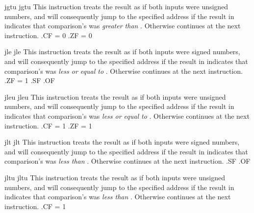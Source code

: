 \begin{instruction}{jgtu}
  \jumptype
     {jgtu}
     {\jjgtuopc}
     {This instruction treats the  result as if both
       inputs were unsigned numbers, and will consequently jump to the
       specified address if the result in  indicates that
       comparison's  was \emph{greater than} .
       Otherwise continues at the next instruction.}
     {.CF = 0 \wedge {}.ZF = 0}
\end{instruction}

\begin{instruction}{jle}
  \jumptype
     {jle}
     {\jjleopc}
     {This instruction treats the  result as if both
       inputs were signed numbers, and will consequently jump to the
       specified address if the result in  indicates that
       comparison's  was \emph{less or equal to} .
       Otherwise continues at the next instruction.}
     {.ZF = 1 \vee {}.SF \neq {}.OF}
\end{instruction}

\begin{instruction}{jleu}
  \jumptype
     {jleu}
     {\jjleuopc}
     {This instruction treats the  result as if both
       inputs were unsigned numbers, and will consequently jump to the
       specified address if the result in  indicates that
       comparison's  was \emph{less or equal to} .
       Otherwise continues at the next instruction.}
     {.CF = 1 \vee {}.ZF = 1}
\end{instruction}

\begin{instruction}{jlt}
  \jumptype
     {jlt}
     {\jjltopc}
     {This instruction treats the  result as if both
       inputs were signed numbers, and will consequently jump to the
       specified address if the result in  indicates that
       comparison's  was \emph{less than} .
       Otherwise continues at the next instruction.}
     {.SF \neq {}.OF}
\end{instruction}

\begin{instruction}{jltu}
  \jumptype
     {jltu}
     {\jjltuopc}
     {This instruction treats the  result as if both
       inputs were unsigned numbers, and will consequently jump to the
       specified address if the result in  indicates that
       comparison's  was \emph{less than} .
       Otherwise continues at the next instruction.}
     {.CF = 1}
\end{instruction}

